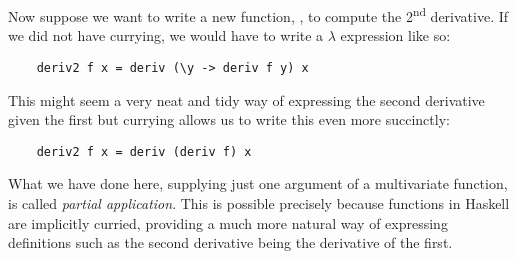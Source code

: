 Now suppose we want to write a new function, , to compute the 2\textsuperscript{nd} derivative. If we did not have currying, we would have to write a $\lambda$ expression like so:
\begin{lstlisting}
    deriv2 f x = deriv (\y -> deriv f y) x
\end{lstlisting}

This might seem a very neat and tidy way of expressing the second derivative given the first but currying allows us to write this even more succinctly:
\begin{lstlisting}
    deriv2 f x = deriv (deriv f) x
\end{lstlisting}
What we have done here, supplying just one argument of a multivariate function, is called {\it partial application}. This is possible precisely because functions in Haskell are implicitly curried, providing a much more natural way of expressing definitions such as the second derivative being the derivative of the first.

